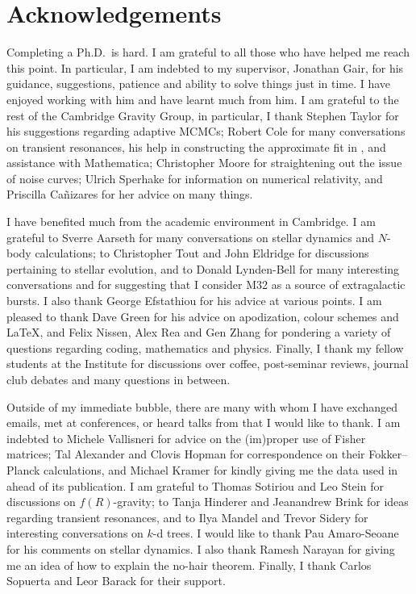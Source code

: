 \chapter*{Acknowledgements}
\label{acknowledgements}

Completing a Ph.D.\ is hard. I am grateful to all those who have helped me reach this point. In particular, I am indebted to my supervisor, Jonathan Gair, for his guidance, suggestions, patience and ability to solve things just in time. I have enjoyed working with him and have learnt much from him. I am grateful to the rest of the Cambridge Gravity Group, in particular, I thank Stephen Taylor for his suggestions regarding adaptive MCMCs; Robert Cole for many conversations on transient resonances, his help in constructing the approximate fit in , and assistance with Mathematica; Christopher Moore for straightening out the issue of noise curves; Ulrich Sperhake for information on numerical relativity, and Priscilla Ca\~{n}izares for her advice on many things.

I have benefited much from the academic environment in Cambridge. I am grateful to Sverre Aarseth for many conversations on stellar dynamics and $N$-body calculations; to Christopher Tout and John Eldridge for discussions pertaining to stellar evolution, and to Donald Lynden-Bell for many interesting conversations and for suggesting that I consider M32 as a source of extragalactic bursts. I also thank George Efstathiou for his advice at various points. I am pleased to thank Dave Green for his advice on apodization, colour schemes and \LaTeX, and Felix Nissen, Alex Rea and Gen Zhang for pondering a variety of questions regarding coding, mathematics and physics. Finally, I thank my fellow students at the Institute for discussions over coffee, post-seminar reviews, journal club debates and many questions in between.

Outside of my immediate bubble, there are many with whom I have exchanged emails, met at conferences, or heard talks from that I would like to thank. I am indebted to Michele Vallisneri for advice on the (im)proper use of Fisher matrices; Tal Alexander and Clovis Hopman for correspondence on their Fokker--Planck calculations, and Michael Kramer for kindly giving me the data used in  ahead of its publication. I am grateful to Thomas Sotiriou and Leo Stein for discussions on $f(R)$-gravity; to Tanja Hinderer and Jeanandrew Brink for ideas regarding transient resonances, and to Ilya Mandel and Trevor Sidery for interesting conversations on $k$-d trees. I would like to thank Pau Amaro-Seoane for his comments on stellar dynamics. I also thank Ramesh Narayan for giving me an idea of how to explain the no-hair theorem. Finally, I thank Carlos Sopuerta and Leor Barack for their support.

